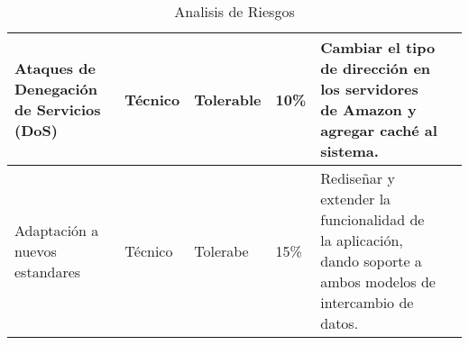 \begin{table}[h]
\begin{tabular}{|p{3cm}|lllll}
        \hline
          \multicolumn{1}{|p{3cm}|}{Ataques de Denegación de Servicios (DoS)} & 
          \multicolumn{1}{p{2cm}|}{Técnico} & 
          \multicolumn{1}{p{2cm}|}{Tolerable} & 
          \multicolumn{1}{p{2cm}|}{10\%} & 
          \multicolumn{1}{p{5cm}|}{Cambiar el tipo de dirección en los servidores de Amazon y agregar caché al sistema.} \\ 
        \hline
          \multicolumn{1}{|p{3cm}|}{Adaptación a nuevos estandares} &
          \multicolumn{1}{p{2cm}|}{Técnico} &
          \multicolumn{1}{p{2cm}|}{Tolerabe} &
          \multicolumn{1}{p{2cm}|}{15\%} &
          \multicolumn{1}{p{5cm}|}{Rediseñar y extender la funcionalidad de la aplicación, dando soporte a ambos modelos de intercambio de datos.} \\ 
        \hline
      \end{tabular}
      \caption{Analisis de Riesgos}
      \label{Analisis de riesgos}
    \end{table}